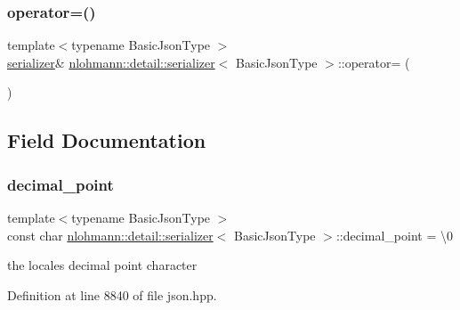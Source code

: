 \subsubsection{\texorpdfstring{operator=()}{operator=()}}
{\footnotesize\ttfamily template$<$typename Basic\+Json\+Type $>$ \\
\hyperlink{classnlohmann_1_1detail_1_1serializer}{serializer}\& \hyperlink{classnlohmann_1_1detail_1_1serializer}{nlohmann\+::detail\+::serializer}$<$ Basic\+Json\+Type $>$\+::operator= (\begin{DoxyParamCaption}\item[{const \hyperlink{classnlohmann_1_1detail_1_1serializer}{serializer}$<$ Basic\+Json\+Type $>$ \&}]{ }\end{DoxyParamCaption})\hspace{0.3cm}{\ttfamily [delete]}}



\subsection{Field Documentation}
\mbox{\label{classnlohmann_1_1detail_1_1serializer_a311e5d6f4b31d5be0eb3c0cb20b6965a}} 
\subsubsection{\texorpdfstring{decimal\+\_\+point}{decimal\_point}}
{\footnotesize\ttfamily template$<$typename Basic\+Json\+Type $>$ \\
const char \hyperlink{classnlohmann_1_1detail_1_1serializer}{nlohmann\+::detail\+::serializer}$<$ Basic\+Json\+Type $>$\+::decimal\+\_\+point = \textquotesingle{}\textbackslash{}0\textquotesingle{}\hspace{0.3cm}{\ttfamily [private]}}



the locale\textquotesingle{}s decimal point character 



Definition at line 8840 of file json.\+hpp.

\mbox{\label{classnlohmann_1_1detail_1_1serializer_a9a55e6b028d09676fe35aefa0c72ea5b}} 

